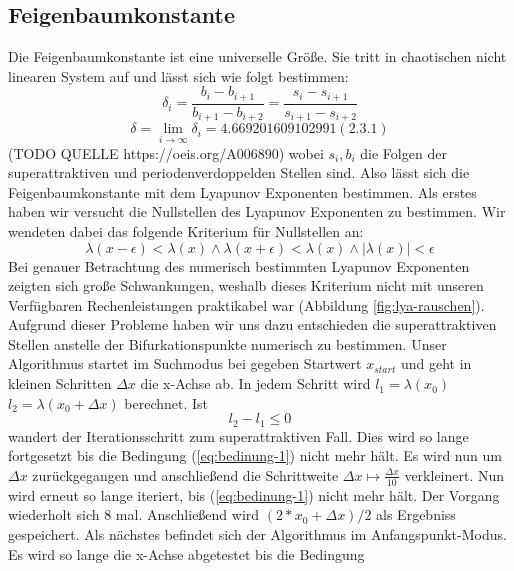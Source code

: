 \documentclass{scrartcl}
\begin{document}
\subsection{Feigenbaumkonstante}
Die Feigenbaumkonstante ist eine universelle Größe. Sie tritt in chaotischen nicht linearen System auf und lässt sich wie folgt bestimmen:
\begin{equation}\delta_i = \frac{b_i-b_{i+1}}{b_{i+1}-b_{i+2}}=\frac{s_i-s_{i+1}}{s_{i+1}-s_{i+2}}\end{equation}
\begin{equation}\delta = \lim\limits_{i \rightarrow \infty}{\delta_i} = 4.669201609102991 (2.3.1)\end{equation} 
(TODO QUELLE https://oeis.org/A006890)
wobei $s_i, b_i$ die Folgen der superattraktiven und periodenverdoppelden Stellen sind.
Also lässt sich die Feigenbaumkonstante mit dem Lyapunov Exponenten bestimmen. 
Als erstes haben wir versucht die Nullstellen des Lyapunov Exponenten zu bestimmen. Wir wendeten dabei das folgende Kriterium für Nullstellen an:
\begin{equation}
\lambda(x-\epsilon) < \lambda(x) \wedge \lambda(x+\epsilon) < \lambda(x) \wedge |\lambda(x)|<\epsilon
\end{equation}
Bei genauer Betrachtung des numerisch bestimmten Lyapunov Exponenten zeigten sich große Schwankungen, weshalb dieses Kriterium nicht mit unseren Verfügbaren Rechenleistungen praktikabel war (Abbildung \ref{fig:lya-rauschen}).
Aufgrund dieser Probleme
haben wir uns dazu entschieden die superattraktiven Stellen anstelle der Bifurkationspunkte numerisch zu bestimmen. Unser Algorithmus startet im Suchmodus bei gegeben Startwert $x_{start}$ und geht in kleinen Schritten $\Delta x$ die x-Achse ab. In jedem Schritt wird $l_1=\lambda(x_0)$ $l_2=\lambda(x_0 + \Delta x)$ berechnet. 
Ist
\begin{equation}
l_2-l_1 \leq 0 
\label{eq:bedinung-1}
\end{equation}
wandert der Iterationsschritt zum superattraktiven Fall. 
Dies wird so lange fortgesetzt bis die Bedingung (\ref{eq:bedinung-1}) nicht mehr hält. 
Es wird nun um $\Delta x$ zurückgegangen und anschließend die Schrittweite $\Delta x \mapsto \frac{\Delta x}{10} $ verkleinert. Nun wird erneut so lange iteriert, bis (\ref{eq:bedinung-1}) nicht mehr hält. 
Der Vorgang wiederholt sich 8 mal. Anschließend wird $(2*x_0 + \Delta x )/2$ als Ergebniss gespeichert. 
Als nächstes befindet sich der Algorithmus im Anfangspunkt-Modus. Es wird so lange die x-Achse abgetestet bis die Bedingung 
\end{document}
